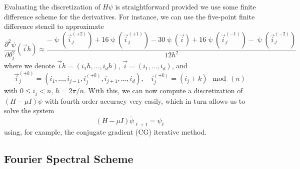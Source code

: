 \documentclass{amsart}
\begin{document}
Evaluating the discretization of $H \psi$ is straightforward provided we use
some finite difference scheme for the derivatives. For instance, we can use the
five-point finite difference stencil to approximate
\begin{equation}
  \frac{\partial^2 \psi}{\partial \theta_j^2}(\Vec{i} h) \approx
  \frac{-\uppsi(\Vec{i}_j^{(+2)}) + 16 \uppsi(\Vec{i}_j^{(+1)}) - 30
  \uppsi(\Vec{i}) + 16 \uppsi(\Vec{i}_j^{(-1)}) - \uppsi(\Vec{i}_j^{(-2)})}{12
  h^2}
\end{equation}
where we denote $\Vec{i} h = (i_1 h, \ldots, i_d h)$, $\Vec{i} = (i_1, \ldots,
i_d)$, and
\begin{equation}
  \Vec{i}_j^{(\pm k)} = (i_1, \ldots, i_{j - 1}, i_j^{(\pm k)}, i_{j + 1},
  \ldots, i_d), \quad i_j^{(\pm k)} = (i_j \pm k) \mod (n)
\end{equation}
with $0 \leq i_j < n$, $h = 2 \pi / n$. With this, we can now compute a
discretization of $(H - \mu I) \psi$ with fourth order accuracy very easily,
which in turn allows us to solve the system
\begin{equation}
  (H - \mu I) \widetilde{\psi}_{\ell + 1} = \psi_{\ell}
\end{equation}
using, for example, the conjugate gradient (CG) iterative method.

\subsection{Fourier Spectral Scheme}
\end{document}
